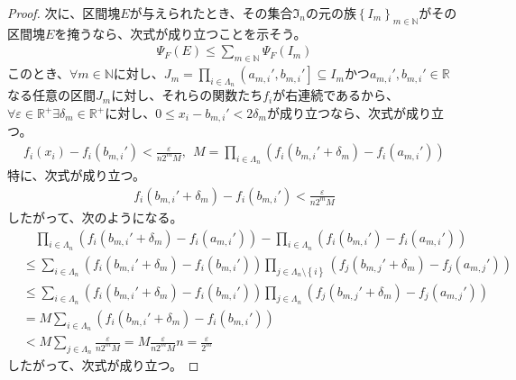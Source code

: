 \documentclass[dvipdfmx]{jsarticle}
\begin{document}
\begin{proof}
次に、区間塊$E$が与えられたとき、その集合$\mathfrak{I}_{n}$の元の族$\left\{ I_{m} \right\}_{m \in \mathbb{N}}$がその区間塊$E$を掩うなら、次式が成り立つことを示そう。
\begin{align*}
\varPsi_{F}(E) \leq \sum_{m \in \mathbb{N}} {\varPsi_{F}\left( I_{m} \right)}
\end{align*}
このとき、$\forall m \in \mathbb{N}$に対し、$J_{m} = \prod_{i \in \varLambda_{n}} \left( a_{m,i}',b_{m,i}' \right] \subseteq I_{m}$かつ$a_{m,i}',b_{m,i}' \in \mathbb{R}$なる任意の区間$J_{m}$に対し、それらの関数たち$f_{i}$が右連続であるから、$\forall\varepsilon \in \mathbb{R}^{+}\exists\delta_{m} \in \mathbb{R}^{+}$に対し、$0 \leq x_{i} - b_{m,i}' < 2\delta_{m}$が成り立つなら、次式が成り立つ。
\begin{align*}
f_{i}\left( x_{i} \right) - f_{i}\left( b_{m,i}' \right) < \frac{\varepsilon}{n2^{m}M},\ \ M = \prod_{i \in \varLambda_{n}} \left( f_{i}\left( b_{m,i}' + \delta_{m} \right) - f_{i}\left( a_{m,i}' \right) \right)
\end{align*}
特に、次式が成り立つ。
\begin{align*}
f_{i}\left( b_{m,i}' + \delta_{m} \right) - f_{i}\left( b_{m,i}' \right) < \frac{\varepsilon}{n2^{m}M}
\end{align*}
したがって、次のようになる。
\begin{align*}
&\quad \prod_{i \in \varLambda_{n}} \left( f_{i}\left( b_{m,i}' + \delta_{m} \right) - f_{i}\left( a_{m,i}' \right) \right) - \prod_{i \in \varLambda_{n}} \left( f_{i}\left( b_{m,i}' \right) - f_{i}\left( a_{m,i}' \right) \right)\\
&\leq \sum_{i \in \varLambda_{n}} {\left( f_{i}\left( b_{m,i}' + \delta_{m} \right) - f_{i}\left( b_{m,i}' \right) \right)\prod_{j \in \varLambda_{n} \setminus \left\{ i \right\}} \left( f_{j}\left( b_{m,j}' + \delta_{m} \right) - f_{j}\left( a_{m,j}' \right) \right)}\\
&\leq \sum_{i \in \varLambda_{n}} {\left( f_{i}\left( b_{m,i}' + \delta_{m} \right) - f_{i}\left( b_{m,i}' \right) \right)\prod_{j \in \varLambda_{n}} \left( f_{j}\left( b_{m,j}' + \delta_{m} \right) - f_{j}\left( a_{m,j}' \right) \right)}\\
&= M\sum_{i \in \varLambda_{n}} \left( f_{i}\left( b_{m,i}' + \delta_{m} \right) - f_{i}\left( b_{m,i}' \right) \right)\\
&< M\sum_{j \in \varLambda_{n}} \frac{\varepsilon}{n2^{m}M} = M\frac{\varepsilon}{n2^{m}M}n = \frac{\varepsilon}{2^{m}}
\end{align*}
したがって、次式が成り立つ。

\end{proof}
\end{document}
